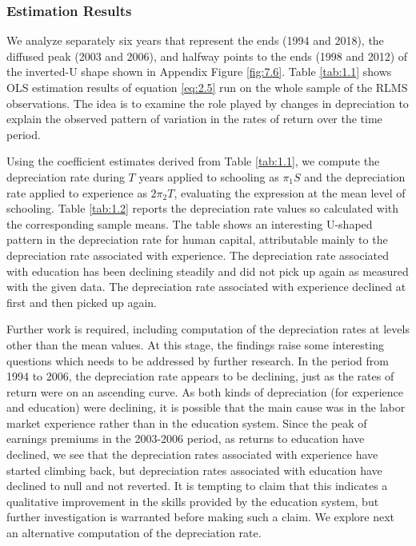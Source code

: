 \documentclass[alpha-refs]{wiley-article-02b}
\begin{document}
\subsubsection{Estimation Results}

We analyze separately six years that represent the ends (1994 and 2018), the 
diffused peak (2003 and 2006), and halfway points to the ends (1998 and 
2012) of the inverted-U shape shown in Appendix Figure \ref{fig:7.6}. Table 
\ref{tab:1.1} shows OLS estimation results of equation \ref{eq:2.5} run on 
the whole sample of the RLMS observations. The idea is to examine the role 
played by changes in depreciation to explain the observed pattern of 
variation in the rates of return over the time period. 

Using the coefficient estimates derived from Table \ref{tab:1.1}, we compute the depreciation rate during $T$ years applied to schooling as $\pi_{1}S $ and the depreciation rate applied to experience as $ 2\pi_{2}T$, evaluating the expression at the mean level of schooling. Table \ref{tab:1.2} reports the depreciation rate values so calculated with the corresponding sample means. The table shows an interesting U-shaped pattern in the depreciation rate for human capital, attributable mainly to the depreciation rate associated with experience. The depreciation rate associated with education has been declining steadily and did not pick up again as measured with the given data. The depreciation rate associated with experience declined at first and then picked up again. 

Further work is required, including computation of the depreciation rates 
at levels other than the mean values. At this stage, the findings raise 
some interesting questions which needs to be addressed by further research. 
In the period from 1994 to 2006, the depreciation rate appears to be 
declining, just as the rates of return were on an ascending curve. As both 
kinds of depreciation (for experience and education) were declining, it is 
possible that the main cause was in the labor market experience rather than 
in the education system. Since the peak of earnings premiums in the 
2003-2006 period, as returns to education have declined, we see that the 
depreciation rates associated with experience have started climbing back, 
but depreciation rates associated with education have declined to null and 
not reverted. It is tempting to claim that this indicates a qualitative 
improvement in the skills provided by the education system, but further 
investigation is warranted before making such a claim. We explore next an 
alternative computation of the depreciation rate. 
\end{document}
